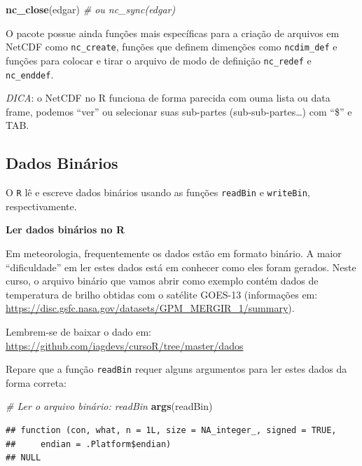 \documentclass[]{book}
\newenvironment{Shaded}{\begin{snugshade}}{\end{snugshade}}
\newcommand{\KeywordTok}[1]{\textcolor[rgb]{0.13,0.29,0.53}{\textbf{#1}}}
\newcommand{\CommentTok}[1]{\textcolor[rgb]{0.56,0.35,0.01}{\textit{#1}}}
\newcommand{\NormalTok}[1]{#1}
\theoremstyle{definition}
\theoremstyle{definition}
\theoremstyle{definition}
\theoremstyle{remark}
\begin{document}
\begin{Shaded}
\begin{Highlighting}[]
\KeywordTok{nc_close}\NormalTok{(edgar) }\CommentTok{# ou nc_sync(edgar)}
\end{Highlighting}
\end{Shaded}

O pacote possue ainda funções mais específicas para a criação de
arquivos em NetCDF como \texttt{nc\_create}, funções que definem
dimenções como \texttt{ncdim\_def} e funções para colocar e tirar o
arquivo de modo de definição \texttt{nc\_redef} e \texttt{nc\_enddef}.

\emph{DICA}: o NetCDF no R funciona de forma parecida com ouma lista ou
data frame, podemos ``ver'' ou selecionar suas sub-partes
(sub-sub-partes\ldots{}) com ``\$'' e TAB.

\subsection{Dados Binários}\label{dados-binarios}

O \texttt{R} lê e escreve dados binários usando as funções
\texttt{readBin} e \texttt{writeBin}, respectivamente.

\textbf{Ler dados binários no R}

Em meteorologia, frequentemente os dados estão em formato binário. A
maior ``dificuldade'' em ler estes dados está em conhecer como eles
foram gerados. Neste curso, o arquivo binário que vamos abrir como
exemplo contém dados de temperatura de brilho obtidas com o satélite
GOES-13 (informações em:
\url{https://disc.gsfc.nasa.gov/datasets/GPM_MERGIR_1/summary}).

Lembrem-se de baixar o dado em:
\url{https://github.com/iagdevs/cursoR/tree/master/dados}

Repare que a função \texttt{readBin} requer alguns argumentos para ler
estes dados da forma correta:

\begin{Shaded}
\begin{Highlighting}[]
\CommentTok{# Ler o arquivo binário: readBin}
\KeywordTok{args}\NormalTok{(readBin)}
\end{Highlighting}
\end{Shaded}

\begin{verbatim}
## function (con, what, n = 1L, size = NA_integer_, signed = TRUE, 
##     endian = .Platform$endian) 
## NULL
\end{verbatim}
\end{document}

